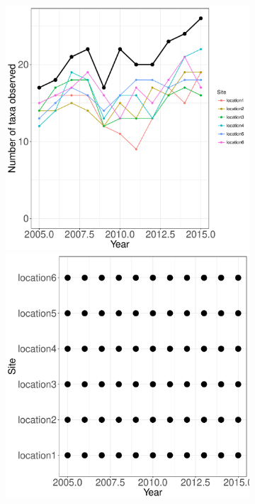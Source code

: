 \documentclass[11pt, oneside]{article}
\begin{document}
\begin{figure}[h!]
\begin{figure}[h!]
\includegraphics[scale = 0.4]{mcr-coral-castorani_num_taxa_over_time.pdf}
\includegraphics[scale = 0.4]{mcr-coral-castorani_spatiotemporal_sampling_effort.pdf}

\end{figure}
\end{figure}
\end{document}
